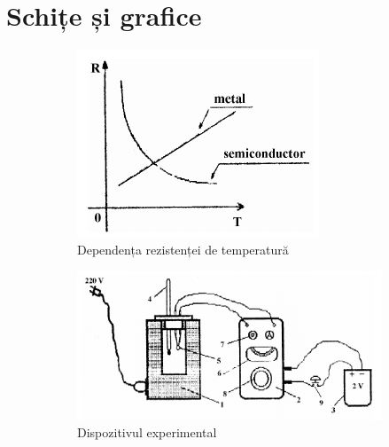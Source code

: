 \documentclass[a4paper]{article}
\begin{document}
\section{Schițe și grafice}
\begin{figure}[htbp]
	\centering
	\begin{subfigure}{0.45\textwidth}
		\centering
		\includegraphics[width=\linewidth]{rez-temp.png}
		\caption{Dependența rezistenței de temperatură}
		\label{fig:grafic_RT}
	\end{subfigure}
	\hfill
	\begin{subfigure}{0.45\textwidth}
		\centering
		\includegraphics[width=\linewidth]{device.png}
		\caption{Dispozitivul experimental}
		\label{fig:device}
	\end{subfigure}
	\caption{}
\end{figure}
\end{document}
